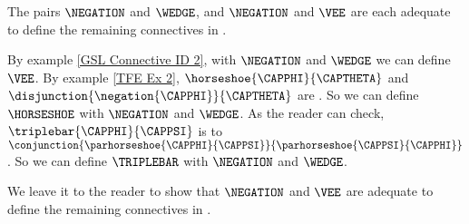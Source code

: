 \begin{majorILnc}{}
	The pairs $\NEGATION$ and $\WEDGE$, and $\NEGATION$ and $\VEE$ are each adequate to define the remaining connectives in \GSL{}.
\end{majorILnc}
\begin{PROOF}
	By example \ref{GSL Connective ID 2}, with $\NEGATION$ and $\WEDGE$ we can define $\VEE$. 
	By example \ref{TFE Ex 2}, $\horseshoe{\CAPPHI}{\CAPTHETA}$ and $\disjunction{\negation{\CAPPHI}}{\CAPTHETA}$ are .
	So we can define $\HORSESHOE$ with $\NEGATION$ and $\WEDGE$. 
	As the reader can check, $\triplebar{\CAPPHI}{\CAPPSI}$ is  to $\conjunction{\parhorseshoe{\CAPPHI}{\CAPPSI}}{\parhorseshoe{\CAPPSI}{\CAPPHI}}$.
	So we can define $\TRIPLEBAR$ with $\NEGATION$ and $\WEDGE$.
	
	We leave it to the reader to show that $\NEGATION$ and $\VEE$ are adequate to define the remaining connectives in \GSL{}.
\end{PROOF}

